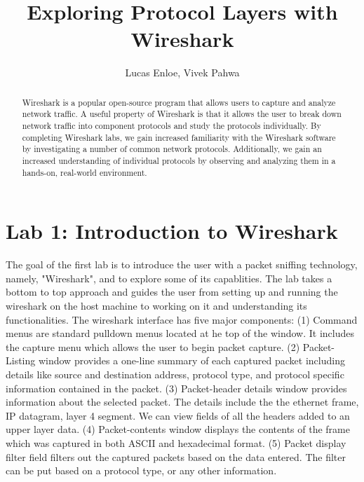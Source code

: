 \documentclass[10pt]{IEEEtran}
\title{Exploring Protocol Layers with Wireshark}
\author{Lucas Enloe, Vivek Pahwa}
\begin{document}
\maketitle

\begin{abstract}
Wireshark is a popular open-source program that allows users to capture and analyze network traffic. A useful property of Wireshark is that it allows the user to break down network traffic into component protocols and study the protocols individually. By completing Wireshark labs, we gain increased familiarity with the Wireshark software by investigating a number of common network protocols. Additionally, we gain an increased understanding of individual protocols by observing and analyzing them in a hands-on, real-world environment.
\end{abstract}

\section{Lab 1: Introduction to Wireshark}
 The goal of the first lab is to introduce the user with a packet sniffing technology, namely, "Wireshark", and to explore some of its capablities. The lab takes a bottom to top approach and guides the user from setting up and running the wireshark on the host machine to working on it and understanding its functionalities. The wireshark interface has five major components: (1)  Command menus are standard pulldown menus located at he top of the window. It includes the capture menu which allows the user to begin packet capture. (2) Packet-Listing window provides a one-line summary of each captured packet including details like source and destination address, protocol type, and protocol specific information contained in the packet. (3) Packet-header details window provides  information about the selected packet. The details include the the ethernet frame, IP datagram, layer 4 segment. We can view fields of all the headers added to an upper layer data.  (4) Packet-contents window displays the contents of the frame which was captured in both ASCII and hexadecimal format. (5) Packet display filter field filters out the captured packets based on the data entered. The filter can be put based on a protocol type, or any other information.\\
 
\end{document}
